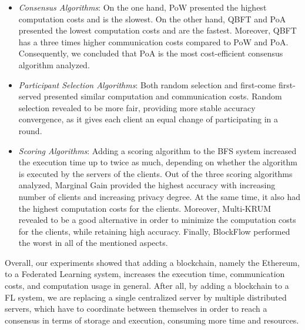 \begin{itemize}
    \item \textit{Consensus Algorithms}: On the one hand, PoW presented the highest computation costs and is the slowest. On the other hand, QBFT and PoA presented the lowest computation costs and are the fastest. Moreover, QBFT has a three times higher communication costs compared to PoW and PoA. Consequently, we concluded that PoA is the most cost-efficient consensus algorithm analyzed. %
    
    \item \textit{Participant Selection Algorithms}: Both random selection and first-come first-served presented similar computation and communication costs. Random selection revealed to be more fair, providing more stable accuracy convergence, as it gives each client an equal change of participating in a round.
    
    \item \textit{Scoring Algorithms}: Adding a scoring algorithm to the BFS system increased the execution time up to twice as much, depending on whether the algorithm is executed by the servers of the clients. Out of the three scoring algorithms analyzed, Marginal Gain provided the highest accuracy with increasing number of clients and increasing privacy degree. At the same time, it also had the highest computation costs for the clients. Moreover, Multi-KRUM revealed to be a good alternative in order to minimize the computation costs for the clients, while retaining high accuracy. Finally, BlockFlow performed the worst in all of the mentioned aspects. %
\end{itemize}

Overall, our experiments showed that adding a blockchain, namely the Ethereum, to a Federated Learning system, increases the execution time, communication costs, and computation usage in general. After all, by adding a blockchain to a FL system, we are replacing a single centralized server by multiple distributed servers, which have to coordinate between themselves in order to reach a consensus in terms of storage and execution, consuming more time and resources. %

